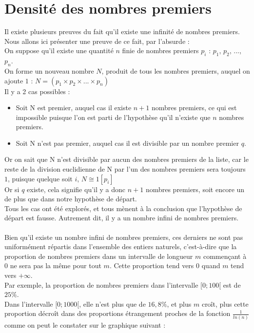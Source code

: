 	\section{Densité des nombres premiers}
		Il existe plusieurs preuves du fait qu'il existe une infinité de nombres premiers. Nous allons ici présenter une preuve de ce fait, par l'absurde :\\
		On suppose qu'il existe une quantité $n$ finie de nombres premiers $p_i$ : $p_1$, $p_2$, $...$, $p_n$.\\
		On forme un nouveau nombre $N$, produit de tous les nombres premiers, auquel on ajoute $1$ : $N = (p_1 \times p_2 \times ... \times p_n)$\\
		Il y a 2 cas possibles :
		\begin{itemize}
			\item Soit N est premier, auquel cas il existe $n + 1$ nombres premiers, ce qui est impossible puisque l'on est parti de l'hypothèse qu'il n'existe que $n$ nombres premiers.
			\item Soit N n'est pas premier, auquel cas il est divisible par un nombre premier $q$.
		\end{itemize}
		Or on sait que N n'est divisible par aucun des nombres premiers de la liste, car le reste de la division euclidienne de N par l'un des nombres premiers sera toujours $1$, puisque quelque soit $i$, $N \cong 1 [p_i]$\\
		Or si $q$ existe, cela signifie qu'il y a donc $n + 1$ nombres premiers, soit encore un de plus que dans notre hypothèse de départ.\\
		Tous les cas ont été explorés, et tous mènent à la conclusion que l'hypothèse de départ est fausse. Autrement dit, il y a un nombre infini de nombres premiers.\\
		\\
		Bien qu'il existe un nombre infini de nombres premiers, ces derniers ne sont pas uniformément répartis dans l'ensemble des entiers naturels, c'est-à-dire que la proportion de nombres premiers dans un intervalle de longueur $m$ commençant à 0 ne sera pas la même pour tout $m$. Cette proportion tend vers $0$ quand $m$ tend vers $+\infty$.\\
		Par exemple, la proportion de nombres premiers dans l'intervalle $[0;100[$ est de $25\%$.\\
		Dans l'intervalle $[0;1000[$, elle n'est plus que de $16,8\%$, et plus $m$ croît, plus cette proportion décroît dans des proportions étrangement proches de la fonction $\frac{1}{ln(n)}$ comme on peut le constater sur le graphique suivant :\\
